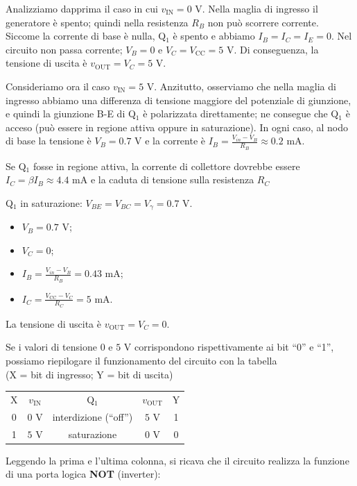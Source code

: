 \documentclass[10pt,a4paper,twoside,twocolumn]{article}
\newcommand{\hfrac}{\rule[-1ex]{0ex}{3.5ex}} %
\begin{document}
Analizziamo dapprima il caso in cui $v_\text{IN} = 0 \text{~V}$.
Nella maglia di ingresso il generatore \`e spento; quindi nella resistenza $R_B$ non pu\`o scorrere corrente.
Siccome la corrente di base \`e nulla,
Q$_1$ \`e spento e abbiamo $I_B = I_C = I_E = 0$. 
Nel circuito non passa corrente; 
$V_B = 0$ e $V_C = V_\text{CC} = 5 \text{~V}$.
Di conseguenza,
la tensione di uscita \`e $v_\text{OUT} = V_C = 5 \text{~V}$.


Consideriamo ora il caso $v_\text{IN} = 5 \text{~V}$.
Anzitutto, osserviamo che nella maglia di ingresso abbiamo una differenza di tensione maggiore del potenziale di giunzione, e quindi la giunzione B-E di Q$_1$ \`e polarizzata direttamente; ne consegue che Q$_1$ \`e acceso (pu\`o essere in regione attiva oppure in saturazione).
In ogni caso, al nodo di base la tensione \`e $V_B = 0.7 \text{~V}$ e 
la corrente \`e $I_B = \frac{V_{in} - V_B}{R_B} \approx 0.2 \text{~mA}$.

Se Q$_1$ fosse in regione attiva, la corrente di collettore dovrebbe essere $I_C = \beta I_B \approx 4.4 \text{~mA}$ e la caduta di tensione sulla resistenza $R_C$

Q$_1$ in saturazione\color{black}: $V_{BE} = V_{BC} = V_\gamma = 0.7 \text{~V}$. 
\begin{itemize}
\item
$V_B = 0.7 \text{~V}$; 
\item
$V_C = 0$; 
\item
$I_B = \frac{V_{in} - V_B}{R_B} = 0.43 \text{~mA}$; 
\item
$I_C = \frac{V_\text{CC} - V_C}{R_C} = 5 \text{~mA}$. 
\end{itemize}
La tensione di uscita \`e $v_\text{OUT} = V_C = 0$.



Se i valori di tensione $0$ e $5  \text{~V}$ 
corrispondono rispettivamente ai bit ``0'' e ``1'', 
possiamo riepilogare il funzionamento del circuito con la tabella
\\
(X = bit di ingresso; Y = bit di uscita)
\begin{center}
\begin{tabular}{|c|c||c||c|c|} 
X & $v_\text{IN}$ & Q$_1$ & $v_\text{OUT}$ & Y \hfrac \\ 
0 & $0 \text{~V}$ & interdizione (``off'') & $5 \text{~V}$ & 1 \hfrac \\
1 & $5 \text{~V}$ & saturazione & $0 \text{~V}$ & 0 \hfrac \\ 
\end{tabular}
\end{center}
Leggendo la prima e l'ultima colonna, si ricava che il circuito 
realizza la funzione di una porta logica \textbf{NOT} (inverter):
\begin{center} \leavevmode
\end{center}
\end{document}
